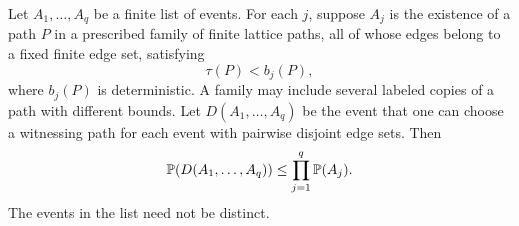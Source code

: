 \begin{lemma}\label{df:wi:continuous-bk}
Let $A_1,\ldots,A_q$ be a finite list of events. For each $j$, suppose
$A_j$ is the existence of a path $P$ in a prescribed family of finite
lattice paths, all of whose edges belong to a fixed finite edge set,
satisfying
\[
 \tau(P)<b_j(P),
\]
where $b_j(P)$ is deterministic. A family may include several labeled
copies of a path with different bounds. Let $D(A_1,\ldots,A_q)$ be
the event that one can choose a witnessing path for each event with
pairwise disjoint edge sets. Then
\begin{equation}\label{df:wi:bk-bound}
 \mathbb P(D(A_1,\ldots,A_q))\le\prod_{j=1}^q\mathbb P(A_j).
\end{equation}
The events in the list need not be distinct.
\end{lemma}
